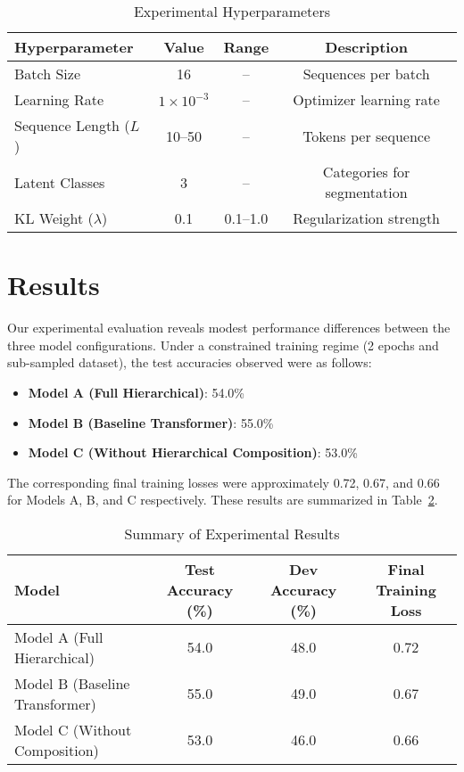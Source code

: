 \documentclass{article}
\begin{document}
\begin{table}[h]
\centering
\caption{Experimental Hyperparameters}
\begin{tabular}{lccc}
\toprule
Hyperparameter & Value & Range & Description \\
\midrule
Batch Size & 16 & -- & Sequences per batch \\
Learning Rate & $1\times10^{-3}$ & -- & Optimizer learning rate \\
Sequence Length ($L$) & 10--50 & -- & Tokens per sequence \\
Latent Classes & 3 & -- & Categories for segmentation \\
KL Weight ($\lambda$) & 0.1 & 0.1--1.0 & Regularization strength \\
\bottomrule
\end{tabular}
\label{tab:hyperparams}
\end{table}

\section{Results}
Our experimental evaluation reveals modest performance differences between the three model configurations. Under a constrained training regime (2 epochs and sub-sampled dataset), the test accuracies observed were as follows:
\begin{itemize}
    \item \textbf{Model A (Full Hierarchical)}: 54.0\%
    \item \textbf{Model B (Baseline Transformer)}: 55.0\%
    \item \textbf{Model C (Without Hierarchical Composition)}: 53.0\%
\end{itemize}
The corresponding final training losses were approximately 0.72, 0.67, and 0.66 for Models A, B, and C respectively. These results are summarized in Table~\ref{tab:exp_results}.

\begin{table}[h]
\centering
\caption{Summary of Experimental Results}
\begin{tabular}{lccc}
\toprule
Model & Test Accuracy (\%) & Dev Accuracy (\%) & Final Training Loss \\
\midrule
Model A (Full Hierarchical) & 54.0 & 48.0 & 0.72 \\
Model B (Baseline Transformer) & 55.0 & 49.0 & 0.67 \\
Model C (Without Composition) & 53.0 & 46.0 & 0.66 \\
\bottomrule
\end{tabular}
\label{tab:exp_results}
\end{table}
\end{document}
